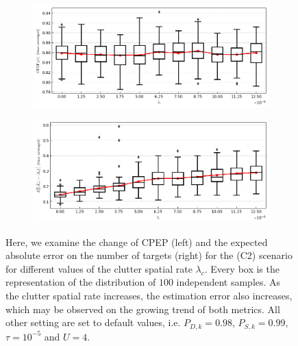 \begin{figure}
    \centering
    \begin{subfigure}[]{0.48\linewidth}
        \centering
        \includegraphics[width=\linewidth]{figures/c2-clutter-cpep.png}
    \end{subfigure}
    \hfill
    \begin{subfigure}[]{0.48\linewidth}
        \centering
        \includegraphics[width=\linewidth]{figures/c2-clutter-eae.png}
    \end{subfigure}
  \caption[(C2). Change of performance depending on the clutter rate.]{Here, we examine the change of CPEP (left) and the expected absolute error on the number of targets (right) for the (C2) scenario for different values of the clutter spatial rate $\lambda_c$. Every box is the representation of the distribution of $100$ independent samples. As the clutter spatial rate increases, the estimation error also increases, which may be observed on the growing trend of both metrics. All other setting are set to default values, i.e. $P_{D,k} = 0.98$, $P_{S,k} = 0.99$, $\tau = 10^{-5}$ and $U = 4$.}
  \label{fig:c2-clutter}
\end{figure}

